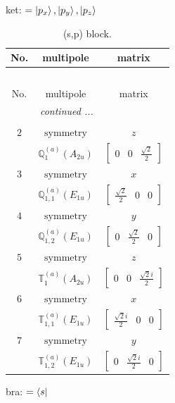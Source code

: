 \documentclass[fleqn,8pt,landscape]{jsarticle}
\begin{document}
\noindent
ket: $=\ket{p_{x}}, \ket{p_{y}}, \ket{p_{z}}$
\renewcommand{\arraystretch}{1.6}
\begin{longtable}{ccc}
\caption{(s,p) block.}
 \\
 \hline \hline
No. & multipole & matrix \\ \hline \endfirsthead

\multicolumn{2}{l}{\tablename\ \thetable{}} \\
 \hline \hline
No. & multipole & matrix \\ \hline \endhead

 \hline \hline
\multicolumn{2}{r}{\footnotesize\it continued ...} \\ \endfoot

 \hline \hline
\multicolumn{2}{r}{} \\ \endlastfoot

$ 2 $ & $ \text{symmetry} $ & $ z $ \\
$  $ & $ \mathbb{Q}_{1}^{(a)}(A_{2u}) $ & $ \begin{bmatrix} 0 & 0 & \frac{\sqrt{2}}{2} \end{bmatrix} $ \\ \hline
$ 3 $ & $ \text{symmetry} $ & $ x $ \\
$  $ & $ \mathbb{Q}_{1,1}^{(a)}(E_{1u}) $ & $ \begin{bmatrix} \frac{\sqrt{2}}{2} & 0 & 0 \end{bmatrix} $ \\ \hline
$ 4 $ & $ \text{symmetry} $ & $ y $ \\
$  $ & $ \mathbb{Q}_{1,2}^{(a)}(E_{1u}) $ & $ \begin{bmatrix} 0 & \frac{\sqrt{2}}{2} & 0 \end{bmatrix} $ \\ \hline
$ 5 $ & $ \text{symmetry} $ & $ z $ \\
$  $ & $ \mathbb{T}_{1}^{(a)}(A_{2u}) $ & $ \begin{bmatrix} 0 & 0 & \frac{\sqrt{2} i}{2} \end{bmatrix} $ \\ \hline
$ 6 $ & $ \text{symmetry} $ & $ x $ \\
$  $ & $ \mathbb{T}_{1,1}^{(a)}(E_{1u}) $ & $ \begin{bmatrix} \frac{\sqrt{2} i}{2} & 0 & 0 \end{bmatrix} $ \\ \hline
$ 7 $ & $ \text{symmetry} $ & $ y $ \\
$  $ & $ \mathbb{T}_{1,2}^{(a)}(E_{1u}) $ & $ \begin{bmatrix} 0 & \frac{\sqrt{2} i}{2} & 0 \end{bmatrix} $ \\ \hline
\end{longtable}
bra: $=\bra{s}$
\end{document}
